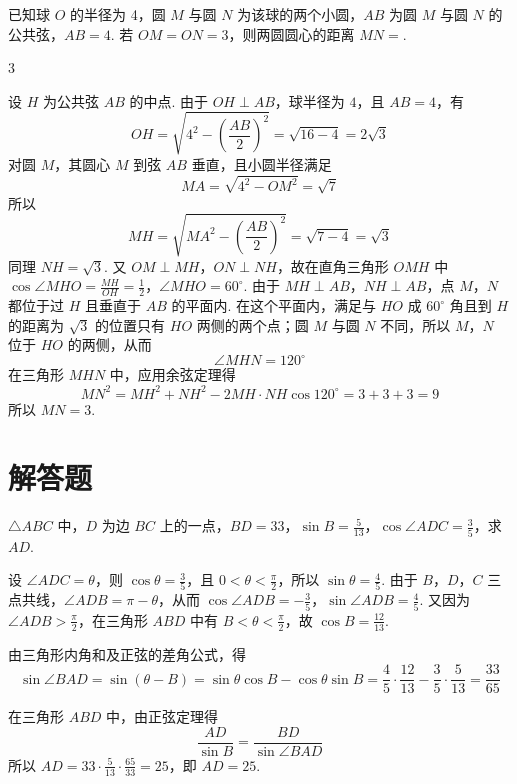 \begin{problem}
已知球 \(O\) 的半径为 4，圆 \(M\) 与圆 \(N\) 为该球的两个小圆，\(AB\) 为圆 \(M\) 与圆 \(N\) 的公共弦，\(AB = 4\). 若 \(OM = ON = 3\)，则两圆圆心的距离 \(MN = \)\fillinblank{}.
\end{problem}

\begin{answer}
\(3\)
\end{answer}

\begin{solution}
设 \(H\) 为公共弦 \(AB\) 的中点. 由于 \(OH\perp AB\)，球半径为 \(4\)，且 \(AB=4\)，有
\[
OH=\sqrt{4^2-\left(\frac{AB}{2}\right)^2}=\sqrt{16-4}=2\sqrt3
\]
对圆 \(M\)，其圆心 \(M\) 到弦 \(AB\) 垂直，且小圆半径满足
\[
MA=\sqrt{4^2-OM^2}=\sqrt7
\]
所以
\[
MH=\sqrt{MA^2-\left(\frac{AB}{2}\right)^2}=\sqrt{7-4}=\sqrt3
\]
同理 \(NH=\sqrt3\). 又 \(OM\perp MH\)，\(ON\perp NH\)，故在直角三角形 \(OMH\) 中
\(\cos\angle MHO=\frac{MH}{OH}=\frac12\)，\(\angle MHO=60^\circ\).
由于 \(MH\perp AB\)，\(NH\perp AB\)，点 \(M\)，\(N\) 都位于过 \(H\) 且垂直于 \(AB\) 的平面内. 在这个平面内，满足与 \(HO\) 成 \(60^\circ\) 角且到 \(H\) 的距离为 \(\sqrt3\) 的位置只有 \(HO\) 两侧的两个点；圆 \(M\) 与圆 \(N\) 不同，所以 \(M\)，\(N\) 位于 \(HO\) 的两侧，从而
\[
\angle MHN=120^\circ
\]
在三角形 \(MHN\) 中，应用余弦定理得
\[
MN^2=MH^2+NH^2-2MH\cdot NH\cos120^\circ=3+3+3=9
\]
所以 \(MN=3\).
\end{solution}

\section{解答题}

\begin{problem}
\(\triangle ABC\) 中，\(D\) 为边 \(BC\) 上的一点，\(BD = 33\)，\(\sin B = \frac{5}{13}\)，\(\cos \angle ADC = \frac{3}{5}\)，求 \(AD\).
\end{problem}

\begin{solution}
设 \(\angle ADC=\theta\)，则 \(\cos\theta=\frac{3}{5}\)，且 \(0<\theta<\frac{\pi}{2}\)，所以 \(\sin\theta=\frac{4}{5}\). 由于 \(B\)，\(D\)，\(C\) 三点共线，\(\angle ADB=\pi-\theta\)，从而 \(\cos\angle ADB=-\frac{3}{5}\)，\(\sin\angle ADB=\frac{4}{5}\). 又因为 \(\angle ADB>\frac{\pi}{2}\)，在三角形 \(ABD\) 中有 \(B<\theta<\frac{\pi}{2}\)，故 \(\cos B=\frac{12}{13}\).

由三角形内角和及正弦的差角公式，得
\[
\sin\angle BAD=\sin(\theta-B)=\sin\theta\cos B-\cos\theta\sin B=\frac{4}{5}\cdot\frac{12}{13}-\frac{3}{5}\cdot\frac{5}{13}=\frac{33}{65}
\]

在三角形 \(ABD\) 中，由正弦定理得
\[
\frac{AD}{\sin B}=\frac{BD}{\sin\angle BAD}
\]
所以 \(AD=33\cdot\frac{5}{13}\cdot\frac{65}{33}=25\)，即 \(AD=25\).
\end{solution}

